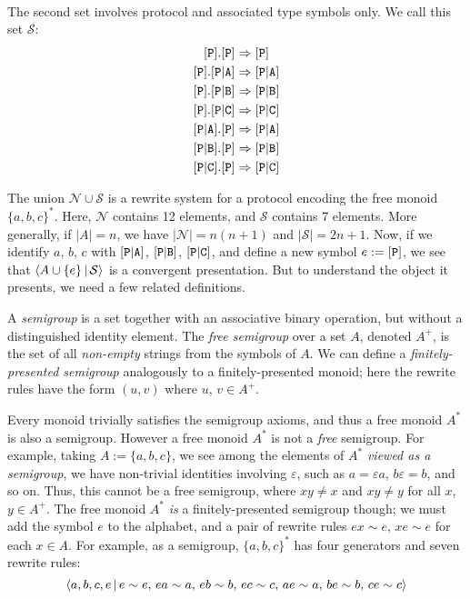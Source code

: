 \documentclass[../generics]{subfiles}
\begin{document}
\begin{example}
\begin{gather*}
\end{gather*}
The second set involves protocol and associated type symbols only. We call this set $\mathcal{S}$:
\begin{gather*}
\ProtoInherit{P}{P}\\
\protosym{P}.\assocsym{P}{A}\Rightarrow\assocsym{P}{A}\\
\protosym{P}.\assocsym{P}{B}\Rightarrow\assocsym{P}{B}\\
\protosym{P}.\assocsym{P}{C}\Rightarrow\assocsym{P}{C}\\
\ProtoConf{\assocsym{P}{A}}{P}\\
\ProtoConf{\assocsym{P}{B}}{P}\\
\ProtoConf{\assocsym{P}{C}}{P}
\end{gather*}

The union $\mathcal{N}\cup\mathcal{S}$ is a rewrite system for a protocol encoding the free monoid $\{a,b,c\}^*$. Here, $\mathcal{N}$ contains 12 elements, and $\mathcal{S}$ contains 7 elements. More generally, if $|A|=n$, we have $|\mathcal{N}|=n(n+1)$ and $|\mathcal{S}|=2n+1$. Now, if we identify $a$, $b$, $c$ with $[\texttt{P}|\texttt{A}]$, $[\texttt{P}|\texttt{B}]$, $[\texttt{P}|\texttt{C}]$, and define a new symbol $e:=[\texttt{P}]$, we see that $\langle A\cup\{e\}\,|\,\mathcal{S}\rangle$ is a convergent presentation. But to understand the object it presents, we need a few related definitions.

A \emph{semigroup} is a set together with an associative binary operation, but without a distinguished identity element. The \emph{free semigroup} over a set $A$, denoted $A^+$, is the set of all \emph{non-empty} strings from the symbols of $A$. We can define a \emph{finitely-presented semigroup} analogously to a finitely-presented monoid; here the rewrite rules have the form $(u,v)$ where $u$, $v\in A^+$.

Every monoid trivially satisfies the semigroup axioms, and thus a free monoid $A^*$ is also a semigroup. However a free monoid $A^*$ is not a \emph{free} semigroup. For example, taking $A:=\{a,b,c\}$, we see among the elements of $A^*$ \emph{viewed as a semigroup}, we have non-trivial identities involving $\varepsilon$, such as $a=\varepsilon a$, $b\varepsilon=b$, and so on. Thus, this cannot be a free semigroup, where $xy\neq x$ and $xy\neq y$ for all $x$, $y\in A^+$. The free monoid $A^*$ \emph{is} a finitely-presented semigroup though; we must add the symbol $e$ to the alphabet, and a pair of rewrite rules $ex\sim e$, $xe\sim e$ for each $x\in A$. For example, as a semigroup, $\{a,b,c\}^*$ has four generators and seven rewrite rules:
\[\langle a,b,c,e\,|\,e\sim e,\,ea\sim a,\,eb\sim b,\,ec\sim c,\,ae\sim a,\,be\sim b,\,ce\sim c\rangle\]


\end{example}
\end{document}
